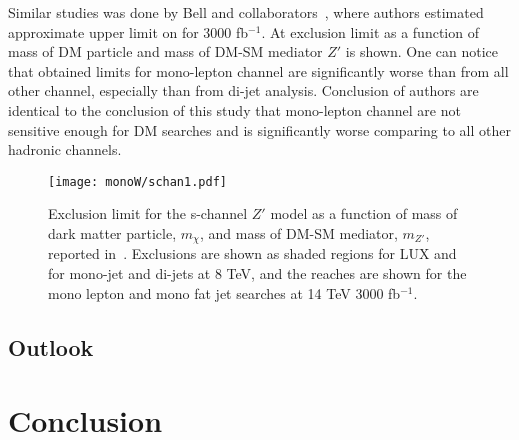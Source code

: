 Similar studies was done by Bell and collaborators~\cite{arXiv:1512.00476}, where authors estimated approximate upper limit on for 3000 fb$^{-1}$. 
At  exclusion limit
as a function of mass of DM particle and mass of DM-SM mediator $Z'$ is shown. One can notice that obtained limits for mono-lepton channel are significantly 
worse than from all other channel, especially than from di-jet analysis. Conclusion of authors are identical to the conclusion of this study that mono-lepton channel
are not sensitive enough for DM searches and is significantly worse comparing to all other hadronic channels.

\begin{figure}[hb]
 \texttt{[image: monoW/schan1.pdf]}
  \caption{Exclusion limit for the s-channel $Z'$ model as a function of mass of dark matter particle, $m_{\chi}$, 
  and mass of DM-SM mediator, $m_{Z'}$, reported in~\cite{arXiv:1512.00476}.
  Exclusions are shown as shaded regions for LUX and for mono-jet and di-jets at 8 TeV, 
  and the reaches are shown for the mono lepton and mono fat jet searches at 14 TeV 3000 fb$^{-1}$.}
  \label{fig:bellExclLim}
\end{figure}

\section{Outlook}
\label{sec:wprimeConclusion}

\chapter{Conclusion}